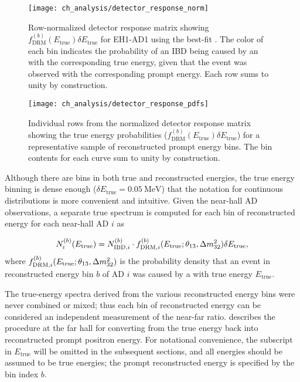 \begin{figure}
    \centering
    \texttt{[image: ch\_analysis/detector\_response\_norm]}
    \caption[Detector response matrix, row-normalized]{
        Row-normalized detector response matrix
        showing $f^{(b)}_\text{DRM}(E_\text{true})\delta E_\text{true}$
        for EH1-AD1 using the best-fit \thetaot{}.
        The color of each bin indicates the probability
        of an IBD being caused by an \nuebar{} with the corresponding true energy,
        given that the event was observed with the corresponding prompt energy.
        Each row sums to unity by construction.
    }
    \label{fig:drm_norm}
\end{figure}

\begin{figure}
    \centering
    \texttt{[image: ch\_analysis/detector\_response\_pdfs]}
    \caption[Individual rows of normalized detector response matrix]{
        Individual rows from the normalized detector response matrix
        showing the true \nuebar{} energy probabilities
        ($f^{(b)}_\text{DRM}(E_\text{true})\delta E_\text{true}$)
        for a representative sample of reconstructed prompt energy bins.
        The bin contents for each curve sum to unity by construction.
    }
    \label{fig:drm_pdfs}
\end{figure}

Although there are bins in both true and reconstructed energies,
the true energy binning is dense enough ($\delta E_{\text{true}} = \SI{0.05}{\MeV}$)
that the notation for continuous distributions is more convenient and intuitive.
Given the near-hall AD observations,
a separate true \nuebar{} spectrum is computed
for each bin of reconstructed energy for each near-hall AD $i$ as

\begin{equation}\label{eq:drm}
    N_i^{(b)}(E_{\text{true}}) = N_{\text{IBD},i}^{(b)}
    \cdot f_{\text{DRM},i}^{(b)}(E_{\text{true}}; \theta_{13}, \Delta m^2_{32}) \delta E_{\text{true}},
\end{equation}
where $f_{\text{DRM},i}^{(b)}(E_{\text{true}}; \theta_{13}, \Delta m^2_{32})$ is the probability density
that an event in reconstructed energy bin $b$
of AD $i$
was caused by a \nuebar{} with true energy $E_{\text{true}}$.

The true-energy spectra derived from the various reconstructed energy bins
were never combined or mixed;
thus each bin of reconstructed energy can be considered an independent measurement
of the near-far ratio.
 describes the procedure at the far hall
for converting from the true \nuebar{} energy back into reconstructed prompt positron energy.
For notational convenience, the subscript in $E_{\text{true}}$ will be omitted
in the subsequent sections,
and all energies should be assumed to be true \nuebar{} energies;
the prompt reconstructed energy is specified by the bin index $b$.

